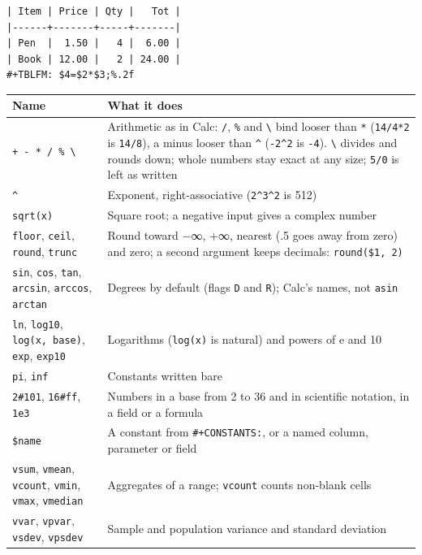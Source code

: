 \documentclass[11pt]{article}
\begin{document}
\begin{verbatim}
| Item | Price | Qty |   Tot |
|------+-------+-----+-------|
| Pen  |  1.50 |   4 |  6.00 |
| Book | 12.00 |   2 | 24.00 |
#+TBLFM: $4=$2*$3;%.2f
\end{verbatim}

\begin{center}
\begin{tabular}{ll}
Name & What it does\\[0pt]
\hline
\texttt{+ - * / \% \textbackslash{}} & Arithmetic as in Calc: \texttt{/}, \texttt{\%} and \texttt{\textbackslash{}} bind looser than \texttt{*} (\texttt{14/4*2} is \texttt{14/8}), a minus looser than \texttt{\textasciicircum{}} (\texttt{-2\textasciicircum{}2} is \texttt{-4}). \texttt{\textbackslash{}} divides and rounds down; whole numbers stay exact at any size; \texttt{5/0} is left as written\\[0pt]
\texttt{\textasciicircum{}} & Exponent, right-associative (\texttt{2\textasciicircum{}3\textasciicircum{}2} is 512)\\[0pt]
\texttt{sqrt(x)} & Square root; a negative input gives a complex number\\[0pt]
\texttt{floor}, \texttt{ceil}, \texttt{round}, \texttt{trunc} & Round toward −∞, +∞, nearest (.5 goes away from zero) and zero; a second argument keeps decimals: \texttt{round(\$1, 2)}\\[0pt]
\texttt{sin}, \texttt{cos}, \texttt{tan}, \texttt{arcsin}, \texttt{arccos}, \texttt{arctan} & Degrees by default (flags \texttt{D} and \texttt{R}); Calc's names, not \texttt{asin}\\[0pt]
\texttt{ln}, \texttt{log10}, \texttt{log(x, base)}, \texttt{exp}, \texttt{exp10} & Logarithms (\texttt{log(x)} is natural) and powers of e and 10\\[0pt]
\texttt{pi}, \texttt{inf} & Constants written bare\\[0pt]
\texttt{2\#101}, \texttt{16\#ff}, \texttt{1e3} & Numbers in a base from 2 to 36 and in scientific notation, in a field or a formula\\[0pt]
\texttt{\$name} & A constant from \texttt{\#+CONSTANTS:}, or a named column, parameter or field\\[0pt]
\texttt{vsum}, \texttt{vmean}, \texttt{vcount}, \texttt{vmin}, \texttt{vmax}, \texttt{vmedian} & Aggregates of a range; \texttt{vcount} counts non-blank cells\\[0pt]
\texttt{vvar}, \texttt{vpvar}, \texttt{vsdev}, \texttt{vpsdev} & Sample and population variance and standard deviation\\[0pt]

\end{tabular}
\end{center}
\end{document}
